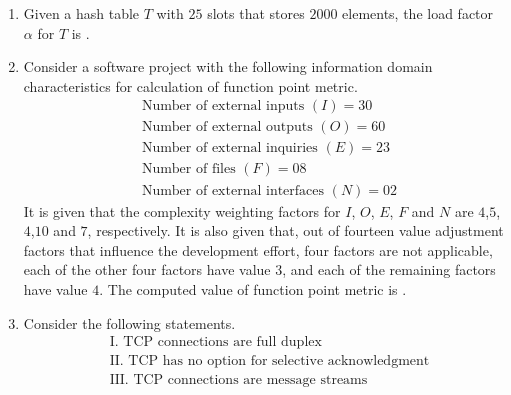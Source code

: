 \documentclass[journal,12pt,onecolumn]{IEEEtran}
\theoremstyle{remark}
\begin{document}
\begin{enumerate}
				\item Given a hash table $T$ with $25$ slots that stores $2000$ elements, the load factor $\alpha$ for $T$ is \underline{\hspace{2cm}}.
				
				\hfill{}
				
				\item Consider a software project with the following information domain characteristics for calculation of function point metric.
				\begin{align*}
					&\text{Number of external inputs } (I) = 30\\
					&\text{Number of external outputs } (O) = 60\\
					&\text{Number of external inquiries } (E) = 23\\
					&\text{Number of files } (F) = 08\\
					&\text{Number of external interfaces } (N) = 02
				\end{align*}
				It is given that the complexity weighting factors for $I$, $O$, $E$, $F$ and $N$ are $4$,$5$,$4$,$10$ and $7$, respectively. It is also given that, out of fourteen value adjustment factors that influence the development effort, four factors are not applicable, each of the other four factors have value $3$, and each of the remaining factors have value $4$. The computed value of function point metric is \underline{\hspace{2cm}}.
				
				\hfill{}
				
				\item Consider the following statements.
				\begin{align*}
					&\text{I. TCP connections are full duplex}\\
					&\text{II. TCP has no option for selective acknowledgment}\\
					&\text{III. TCP connections are message streams}
				\end{align*}
				
				\hfill{}
				
				\begin{enumerate}
				\end{enumerate}
				

\end{enumerate}
\end{document}
